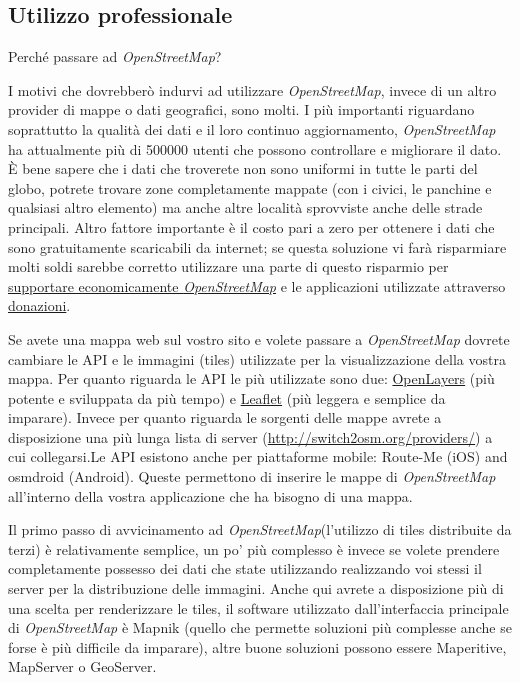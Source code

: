 \documentclass[a4paper,twoside,12pt,]{article}
\newcommand{\osm}{\emph{OpenStreetMap}\xspace}
\begin{document}
\subsection{Utilizzo professionale}
Perché passare ad \osm? 

I motivi che dovrebberò indurvi ad utilizzare \osm, invece di un altro provider di mappe o dati geografici, sono molti. I più importanti riguardano soprattutto la qualità dei dati e il loro continuo aggiornamento, \osm ha attualmente più di 500000 utenti che possono controllare e migliorare il dato. È bene sapere che i dati che troverete non sono uniformi in tutte le parti del globo, potrete trovare zone completamente mappate (con i civici, le panchine e qualsiasi altro elemento) ma anche altre località sprovviste anche delle strade principali. Altro fattore importante è il costo pari a zero per ottenere i dati che sono gratuitamente scaricabili da internet; se questa soluzione vi farà risparmiare molti soldi sarebbe corretto utilizzare una parte di questo risparmio per \href{http://donate.openstreetmap.org/}{supportare economicamente \osm} e le applicazioni utilizzate attraverso \href{http://www.gfoss.it/drupal/donazioni}{donazioni}.

Se avete una mappa web sul vostro sito e volete passare a \osm dovrete cambiare le API e le immagini (tiles) utilizzate per la visualizzazione della vostra mappa. Per quanto riguarda le API le più utilizzate sono due: \href{http://openlayers.org}{OpenLayers} (più potente e sviluppata da più tempo) e \href{http://leaflet.cloudmade.com/}{Leaflet} (più leggera e semplice da imparare). Invece per quanto riguarda le sorgenti delle mappe avrete a disposizione una più lunga lista di server (\url{http://switch2osm.org/providers/}) a cui collegarsi.\newline Le API esistono anche per piattaforme mobile: Route-Me (iOS) and osmdroid (Android). Queste permettono di inserire le mappe di \osm all'interno della vostra applicazione che ha bisogno di una mappa.

Il primo passo di avvicinamento ad \osm (l'utilizzo di tiles distribuite da terzi) è relativamente semplice, un po' più complesso è invece se volete prendere completamente possesso dei dati che state utilizzando realizzando voi stessi il server per la distribuzione delle immagini. Anche qui avrete a disposizione più di una scelta per renderizzare le tiles, il software utilizzato dall'interfaccia principale di \osm è Mapnik (quello che permette soluzioni più complesse anche se forse è più difficile da imparare), altre buone soluzioni possono essere Maperitive, MapServer o GeoServer.
\end{document}
